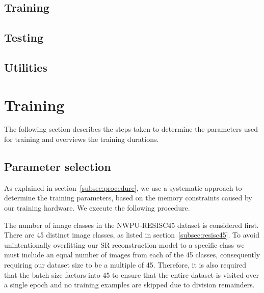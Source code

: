 \subsection{Training}

\subsection{Testing}

\subsection{Utilities}

\section{Training}
The following section describes the steps taken to determine the parameters used for training and overviews the training durations.

\subsection{Parameter selection}\label{subsec:parameter_selection}
As explained in section~\ref{subsec:procedure}, we use a systematic approach to determine the training parameters, based on the memory constraints caused by our training hardware. We execute the following procedure.

The number of image classes in the NWPU-RESISC45 dataset is considered first. There are 45 distinct image classes, as listed in section~\ref{subsec:resisc45}. To avoid unintentionally overfitting our SR reconstruction model to a specific class we must include an equal number of images from each of the 45 classes, consequently requiring our dataset size to be a multiple of 45. Therefore, it is also required that the batch size factors into 45 to ensure that the entire dataset is visited over a single epoch and no training examples are skipped due to division remainders.

